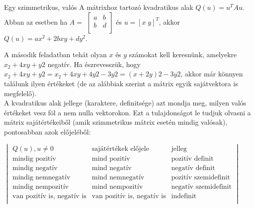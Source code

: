 \begin{frame}
  \begin{tcolorbox}[title={Megoldások {\symking}}]
     Egy szimmetrikus, valós A mátrixhoz tartozó kvadratikus alak $Q(u) = u^TAu$. Abban az esetben ha $A =$ $\begin{bmatrix} 
  				a & b \\
  				b & d \\
			\end{bmatrix}$ és $u = [x \; y]^T$, akkor $Q(u) = ax^2 + 2bxy + dy^2$.\\
			\mmedskip
			
			A második feladatban tehát olyan $x$ és $y$ számokat kell keresnünk, amelyekre $x_2 + 4xy + y2$ negatív. Ha észrevesszük, hogy $x_2 + 4xy + y2 = x_2 + 4xy + 4y2 -3y2 = (x + 2y)2 -3y2$, akkor már könnyen találunk ilyen értékeket (de az alábbiak szerint a mátrix egyik sajátvektora is megfelelő).\\
			
			A kvadratikus alak jellege (karaktere, definitsége) azt mondja meg, milyen valós értékeket vesz föl a nem nulla vektorokon. Ezt a tulajdonságot le tudjuk olvasni a mátrix sajátértékeiből (amik szimmetrikus mátrix esetén mindig valósak), pontosabban azok előjeléből:\\
			\mmedskip
			
			$\begin{vmatrix} 
			Q(u), u \neq 0 & \text{sajátértékek előjele} & \text{jelleg}\\
			\text{mindig pozitív} & \text{mind pozitív} & \text{pozitív definit}\\
			\text{mindig negatív} & \text{mind negatív} & \text{negatív definit}\\
			\text{mindig nemnegatív} & \text{mind nemnegatív} & \text{pozitív szemidefinit}\\
			\text{mindig nempozitív} & \text{mind nempozitív} & \text{negatív szemidefinit}\\
			\text{van pozitív is, negatív is} & \text{van pozitív is, negatív is} & \text{indefinit}\\
			\end{vmatrix}$
			
			\mmedskip
			

\end{tcolorbox}
\end{frame}
